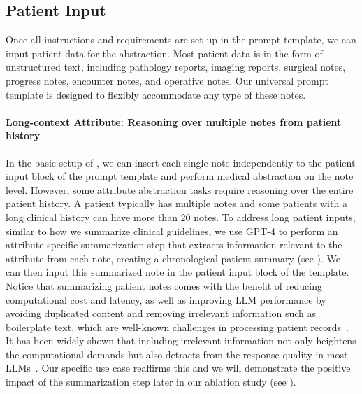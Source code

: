 \subsection{Patient Input}
Once all instructions and requirements are set up in the prompt template, we can input patient data for the abstraction. Most patient data is in the form of unstructured text, including pathology reports, imaging reports, surgical notes, progress notes, encounter notes, and operative notes. Our universal prompt template is designed to flexibly accommodate any type of these notes.

\paragraph{Long-context Attribute: Reasoning over multiple notes from patient history}

In the basic setup of \ours, we can insert each single note independently to the patient input block of the prompt template and perform medical abstraction on the note level. However, some attribute abstraction tasks require reasoning over the entire patient history. A patient typically has multiple notes and some patients with a long clinical history can have more than 20 notes. To address long patient inputs, similar to how we summarize clinical guidelines, we use GPT-4 to perform an attribute-specific summarization step that extracts information relevant to the attribute from each note, creating a chronological patient summary (see ). We can then input this summarized note in the patient input block of the template.
Notice that summarizing patient notes comes with the benefit of reducing computational cost and latency, as well as improving \ac{LLM} performance by avoiding duplicated content and removing irrelevant information such as boilerplate text, which are well-known challenges in processing patient records~\cite{searle2021estimating}. 
It has been widely shown that including irrelevant information not only heightens the computational demands but also detracts from the response quality in most \acp{LLM}~\cite{liu2024lost,mirzadeh2024gsm}. Our specific use case reaffirms this and we will demonstrate the positive impact of the summarization step later in our ablation study (see ). 


